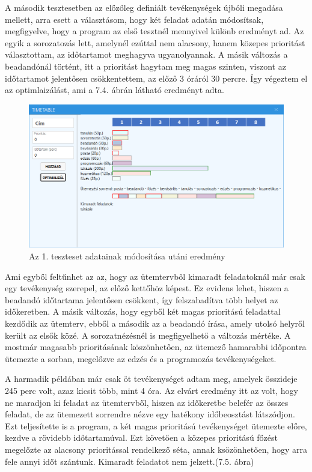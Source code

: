 
A második tesztesetben az előzőleg definiált tevékenységek újbóli megadása mellett, arra esett a választásom, hogy két feladat adatán módosítsak, megfigyelve, hogy a program az első tesztnél mennyivel különb eredményt ad. Az egyik a sorozatozás lett, amelynél ezúttal nem alacsony, hanem közepes prioritást választottam, az időtartamot meghagyva ugyanolyannak. A másik változás a beadandónál történt, itt a prioritást hagytam meg magas szinten, viszont az időtartamot jelentősen csökkentettem, az előző 3 óráról 30 percre. Így végeztem el az optimlaizálást, ami a 7.4. ábrán látható eredményt adta.

\begin{figure}[h]
	\centering
	\includegraphics[scale=0.6]{images/test/result1.2.png}
	\caption{Az 1. teszteset adatainak módosítása utáni eredmény}
\end{figure}

Ami egyből feltűnhet az az, hogy az ütemtervből kimaradt feladatoknál már csak egy tevékenység szerepel, az előző kettőhöz képest. Ez evidens lehet, hiszen a beadandó időtartama jelentősen csökkent, így felszabadítva több helyet az időkeretben. A másik változás, hogy egyből két magas prioritású feladattal kezdődik az ütemterv, ebből a második az a beadandó írása, amely utolsó helyről került az elsők közé. A sorozatnézésnél is megfigyelhető a változás mértéke. A mostmár magasabb prioritásának köszönhetően, az ütemező hamarabbi időpontra ütemezte a sorban, megelőzve az edzés és a programozás tevékenységeket.


A harmadik példában már csak öt tevékenységet adtam meg, amelyek összideje 245 perc volt, azaz kicsit több, mint 4 óra. Az elvárt eredmény itt az volt, hogy ne maradjon ki feladat az ütemtervből, hiszen az időkeretbe belefér az összes feladat, de az ütemezett sorrendre nézve egy hatékony időbeosztást látszódjon. Ezt teljesítette is a program, a két magas prioritású tevékenységet ütemezte előre, kezdve a rövidebb időtartamúval. Ezt követően a közepes prioritású főzést megelőzte az alacsony prioritással rendelkező séta, annak ksözönhetően, hogy arra fele annyi időt szántunk. Kimaradt feladatot nem jelzett.(7.5. ábra)

